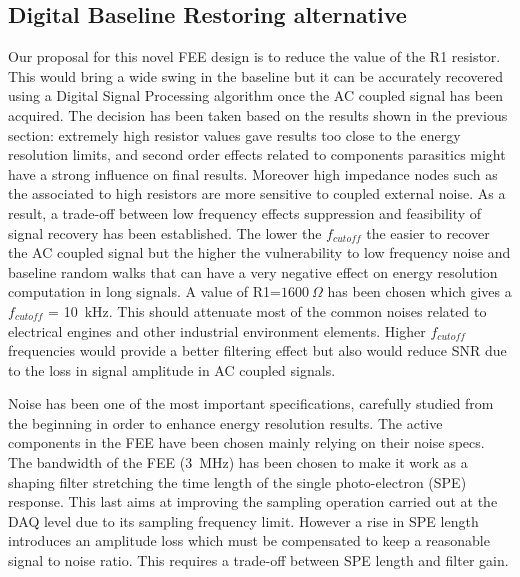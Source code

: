 \documentclass[a4paper, 10pt, oneside, twocolumn, 3p]{elsarticle}
\begin{document}
\subsection{Digital Baseline Restoring alternative}

Our proposal for this novel FEE design is to reduce the value of the R1 resistor. This would bring a wide swing in the baseline but it can be accurately recovered using a Digital Signal Processing algorithm once the AC coupled signal has been acquired. The decision has been taken based on the results shown in the previous section: extremely high resistor values gave results too close to the energy resolution limits, and second order effects related to components parasitics might have a strong influence on final results. Moreover high impedance nodes such as the associated to high resistors are more sensitive to coupled external noise. As a result, a trade-off between low frequency effects suppression and feasibility of signal recovery has been established. The lower the $f_{cutoff}$ the easier to recover the AC coupled signal but the higher the vulnerability to low frequency noise and baseline random walks that can have a very negative effect on energy resolution computation in long signals. A value of R1=$1600~\Omega$ has been chosen which gives a $f_{cutoff}$ = 10~kHz. This should attenuate most of the common noises related to electrical engines and other industrial environment elements. Higher $f_{cutoff}$ frequencies would provide a better filtering effect but also would reduce SNR due to the loss in signal amplitude in AC coupled signals.

\par Noise has been one of the most important specifications, carefully studied from the beginning in order to enhance energy resolution results. The active components in the FEE have been chosen mainly relying on their noise specs. The bandwidth of the FEE (3~MHz) has been chosen to make it work as a shaping filter stretching the time length of the single photo-electron (SPE) response. This last aims at improving the sampling operation carried out at the DAQ level due to its sampling frequency limit. However a rise in SPE length introduces an amplitude loss which must be compensated to keep a reasonable signal to noise ratio. This requires a trade-off between SPE length and filter gain.  
\end{document}
